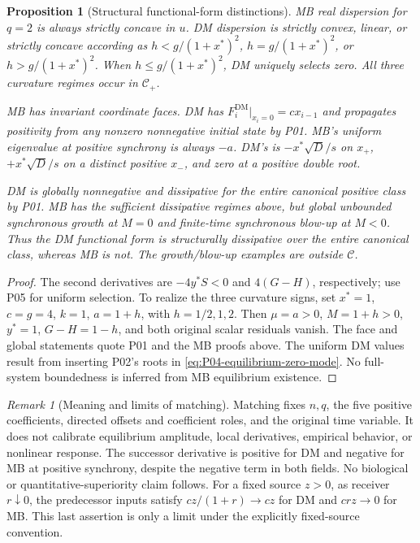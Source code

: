 \documentclass[11pt]{article}
\newcommand{\DM}{\mathrm{DM}}
\newtheorem{proposition}[theorem]{Proposition}
\theoremstyle{definition}
\theoremstyle{remark}
\newtheorem{remark}[theorem]{Remark}
\begin{document}
\begin{proposition}[Structural functional-form distinctions]
\label{prop:P08-structural}
MB real dispersion for $q=2$ is always strictly concave in $u$.
DM dispersion is strictly convex, linear, or strictly concave according
as $h<g/(1+x^*)^2$, $h=g/(1+x^*)^2$, or $h>g/(1+x^*)^2$.
When $h\le g/(1+x^*)^2$, DM uniquely selects zero. All three
curvature regimes occur in $\mathcal C_+$.

MB has invariant coordinate faces. DM has
$F_i^{\DM}|_{x_i=0}=cx_{i-1}$ and propagates positivity from any nonzero
nonnegative initial state by P01. MB's uniform eigenvalue at positive synchrony is
always $-a$. DM's is $-x^*\sqrt D/s$ on $x_+$,
$+x^*\sqrt D/s$ on a distinct positive $x_-$, and zero at a positive
double root.

DM is globally nonnegative and dissipative for the entire canonical
positive class by P01. MB has the sufficient dissipative regimes above,
but global unbounded synchronous growth at $M=0$ and finite-time
synchronous blow-up at $M<0$. Thus the DM functional form is
structurally dissipative over the entire canonical class, whereas MB is
not. The growth/blow-up examples are outside $\mathcal C$.
\end{proposition}
\begin{proof}
The second derivatives are $-4y^*S<0$ and $4(G-H)$, respectively;
use P05 for uniform selection. To realize the three curvature signs,
set $x^*=1$, $c=g=4$, $k=1$, $a=1+h$, with $h=1/2,1,2$.
Then $\mu=a>0$, $M=1+h>0$, $y^*=1$, $G-H=1-h$, and both
original scalar residuals vanish. The face and global statements quote
P01 and the MB proofs above. The uniform DM values result from inserting
P02's roots in \eqref{eq:P04-equilibrium-zero-mode}. No full-system
boundedness is inferred from MB equilibrium existence.
\end{proof}
\begin{remark}[Meaning and limits of matching]
Matching fixes $n,q$, the five positive coefficients, directed offsets
and coefficient roles, and the original time variable. It does not
calibrate equilibrium amplitude, local derivatives, empirical behavior,
or nonlinear response. The successor derivative is positive for DM and
negative for MB at positive synchrony, despite the negative term in both
fields. No biological or quantitative-superiority claim follows.
For a fixed source $z>0$, as receiver $r\downarrow0$, the predecessor
inputs satisfy $cz/(1+r)\to cz$ for DM and $crz\to0$ for MB.
This last assertion is only a limit under the explicitly fixed-source
convention.
\end{remark}
\end{document}
